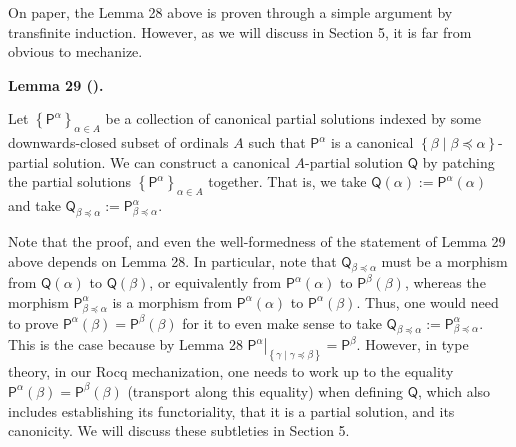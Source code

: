 \documentclass[10pt,a4paper]{article}
\begin{document}
 
 
 
On paper, the Lemma 28 above is proven through a simple argument by transfinite induction. However, as we will discuss in Section 5, it is far from obvious to mechanize.\par
 
 
 
\par\medskip\noindent\textbf{Lemma 29 ().}\par
 
 
Let $\left\{\boldsymbol{\mathsf{P}}^{\alpha}\right\}_{\alpha\in A}$ be a collection of canonical partial solutions indexed by some downwards-closed subset of ordinals $A$ such that $\boldsymbol{\mathsf{P}}^{\alpha}$ is a canonical $\left\{\beta\middle|\beta\preceq\alpha\right\}$-partial solution. We can construct a canonical $A$-partial solution $\boldsymbol{\mathsf{Q}}$ by patching the partial solutions $\left\{\boldsymbol{\mathsf{P}}^{\alpha}\right\}_{\alpha\in A}$ together. That is, we take $\boldsymbol{\mathsf{Q}}(\alpha):=\boldsymbol{\mathsf{P}}^{\alpha}(\alpha)$ and take $\boldsymbol{\mathsf{Q}}_{\beta\preceq\alpha}:=\boldsymbol{\mathsf{P}}^{\alpha}_{\beta\preceq\alpha}$.\par
 
 
 
 
Note that the proof, and even the well-formedness of the statement of Lemma 29 above depends on Lemma 28. In particular, note that $\boldsymbol{\mathsf{Q}}_{\beta\preceq\alpha}$ must be a morphism from $\boldsymbol{\mathsf{Q}}(\alpha)$ to $\boldsymbol{\mathsf{Q}}(\beta)$, or equivalently from $\boldsymbol{\mathsf{P}}^{\alpha}(\alpha)$ to $\boldsymbol{\mathsf{P}}^{\beta}(\beta)$, whereas the morphism $\boldsymbol{\mathsf{P}}^{\alpha}_{\beta\preceq\alpha}$ is a morphism from $\boldsymbol{\mathsf{P}}^{\alpha}(\alpha)$ to $\boldsymbol{\mathsf{P}}^{\alpha}(\beta)$. Thus, one would need to prove $\boldsymbol{\mathsf{P}}^{\alpha}(\beta)=\boldsymbol{\mathsf{P}}^{\beta}(\beta)$ for it to even make sense to take $\boldsymbol{\mathsf{Q}}_{\beta\preceq\alpha}:=\boldsymbol{\mathsf{P}}^{\alpha}_{\beta\preceq\alpha}$. This is the case because by Lemma 28 ${\left.\boldsymbol{\mathsf{P}}^{\alpha}\right|}_{\left\{\gamma\middle|\gamma\preceq\beta\right\}}=\boldsymbol{\mathsf{P}}^{\beta}$. However, in type theory, in our Rocq mechanization, one needs to work up to the equality $\boldsymbol{\mathsf{P}}^{\alpha}(\beta)=\boldsymbol{\mathsf{P}}^{\beta}(\beta)$ (transport along this equality) when defining $\boldsymbol{\mathsf{Q}}$, which also includes establishing its functoriality, that it is a partial solution, and its canonicity. We will discuss these subtleties in Section 5.\par
 
\end{document}
